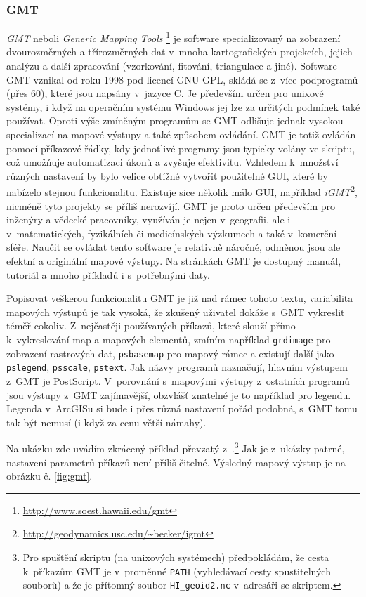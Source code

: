 \documentclass[a4paper,12pt,draft]{article}
\begin{document}
\subsubsection{GMT}
\label{sec:porovnani:gmt}
\emph{GMT} neboli \emph{Generic Mapping Tools}%
\footnote{\url{http://www.soest.hawaii.edu/gmt}} je software
specializovaný na zobrazení dvourozměrných a třírozměrných dat v~mnoha
kartografických projekcích, jejich
analýzu a další zpracování (vzorkování, fitování, triangulace a jiné). Software
GMT vznikal od roku 1998 pod licencí GNU GPL, skládá se z~více podprogramů (přes
60), které jsou napsány v~jazyce C. Je především určen pro unixové systémy, i
když na operačním systému Windows jej lze za určitých podmínek také používat. 
Oproti výše zmíněným programům se GMT odlišuje jednak vysokou specializací na
mapové výstupy a také způsobem ovládání. GMT je totiž ovládán pomocí příkazové
řádky, kdy jednotlivé programy jsou typicky volány ve skriptu, což umožňuje
automatizaci úkonů a zvyšuje efektivitu. Vzhledem k~množství různých nastavení
by bylo velice obtížné vytvořit použitelné GUI, které by nabízelo
stejnou funkcionalitu. Existuje sice několik málo GUI, například
\emph{iGMT}\footnote{\url{http://geodynamics.usc.edu/~becker/igmt}}, nicméně
tyto projekty se příliš nerozvíjí. GMT je proto určen především pro
inženýry a vědecké pracovníky, využíván je nejen v~geografii, ale i
v~matematických, fyzikálních či medicínských výzkumech a také v~komerční sféře.
Naučit se ovládat tento software je relativně náročné, odměnou jsou ale
efektní a originální mapové výstupy. Na stránkách GMT \cite{GMT} je dostupný
manuál, tutoriál a mnoho příkladů i s~potřebnými daty.

Popisovat veškerou funkcionalitu GMT je již nad rámec tohoto textu, variabilita
mapových výstupů je tak vysoká, že zkušený uživatel dokáže s~GMT vykreslit
téměř cokoliv. Z~nejčastěji používaných příkazů, které slouží přímo
k~vykreslování map a mapových elementů, zmíním například \verb|grdimage| pro
zobrazení rastrových dat, \verb|psbasemap| pro mapový rámec a existují další
jako \verb|pslegend|, \verb|psscale|, \verb|pstext|. Jak názvy programů
naznačují, hlavním výstupem z~GMT je PostScript.
V~porovnání s~mapovými výstupy z~ostatních programů jsou výstupy z~GMT
zajímavější, obzvlášť znatelné je to například pro legendu. Legenda v~ArcGISu si
bude i přes různá nastavení pořád podobná, s~GMT tomu tak být nemusí (i když za
cenu větší námahy).

Na ukázku zde uvádím zkrácený příklad převzatý z~\cite[příklad č.
2]{GMT}.\footnote{Pro spuštění skriptu (na unixových systémech) předpokládám, že
cesta k~příkazům GMT je v~proměnné \texttt{PATH} (vyhledávací cesty
spustitelných souborů) a že je přítomný soubor \texttt{HI\_geoid2.nc}
v~adresáři se skriptem.} Jak je z~ukázky patrné, nastavení parametrů příkazů
není příliš čitelné. Výsledný mapový výstup je na obrázku č. \ref{fig:gmt}. 
 
\end{document}
